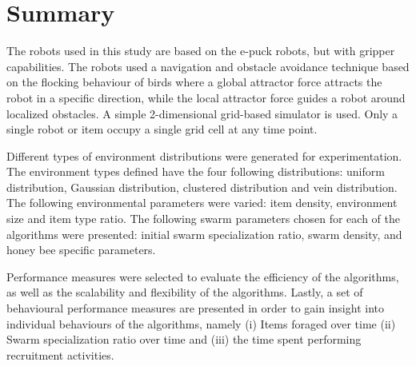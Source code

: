 \section{Summary}
\label{third:summary}
The robots used in this study are based on the e-puck robots, but with gripper capabilities. The robots used a navigation and obstacle avoidance technique based on the flocking behaviour of birds where a global attractor force attracts the robot in a specific direction, while the local attractor force guides a robot around localized obstacles. A simple 2-dimensional grid-based simulator is used. Only a single robot or item occupy a single grid cell at any time point.

Different types of environment distributions were generated for experimentation. The environment types defined have the four following distributions: uniform distribution, Gaussian distribution, clustered distribution and vein distribution. The following environmental parameters were varied: item density, environment size and item type ratio. The following swarm parameters chosen for each of the algorithms were presented: initial swarm specialization ratio, swarm density, and honey bee specific parameters.

Performance measures were selected to evaluate the efficiency of the algorithms, as well as the scalability and flexibility of the algorithms. Lastly, a set of behavioural performance measures are presented in order to gain insight into individual behaviours of the algorithms, namely (i) Items foraged over time (ii) Swarm specialization ratio over time and (iii) the time spent performing recruitment activities.

